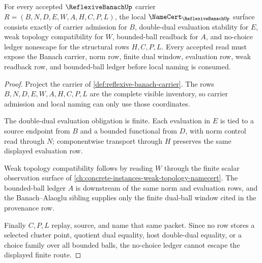 \begin{theorem}
\label{thm:reflexive-banach-namecert-obligations}
For every accepted $\ReflexiveBanachUp$ carrier $R=(B,N,D,E,W,A,H,C,P,L)$, the local $\NameCert_{\ReflexiveBanachUp}$ surface consists exactly of carrier admission for $B$, double-dual evaluation stability for $E$, weak topology compatibility for $W$, bounded-ball readback for $A$, and no-choice ledger nonescape for the structural rows $H,C,P,L$. Every accepted read must expose the Banach carrier, norm row, finite dual window, evaluation row, weak readback row, and bounded-ball ledger before local naming is consumed.
\end{theorem}
\begin{proof}
Project the carrier of \autoref{def:reflexive-banach-carrier}. The rows $B,N,D,E,W,A,H,C,P,L$ are the complete visible inventory, so carrier admission and local naming can only use those coordinates.

The double-dual evaluation obligation is finite. Each evaluation in $E$ is tied to a source endpoint from $B$ and a bounded functional from $D$, with norm control read through $N$; componentwise transport through $H$ preserves the same displayed evaluation row.

Weak topology compatibility follows by reading $W$ through the finite scalar observation surface of \autoref{ch:concrete-instances-weak-topology-namecert}. The bounded-ball ledger $A$ is downstream of the same norm and evaluation rows, and the Banach--Alaoglu sibling supplies only the finite dual-ball window cited in the provenance row.

Finally $C,P,L$ replay, source, and name that same packet. Since no row stores a selected cluster point, quotient dual equality, host double-dual equality, or a choice family over all bounded balls, the no-choice ledger cannot escape the displayed finite route.
\end{proof}

